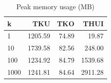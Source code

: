 \begin{table}[H]
\caption{Peak memory usage (MB)}\label{tab:memory}
\centering
\begin{tabular}{@{}lrrr@{}}
\toprule
\textbf{k} & \textbf{TKU} & \textbf{TKO} & \textbf{THUI} \\
\midrule
1 & 1205.59 & 74.89 & 19.87 \\
10 & 1739.58 & 82.56 & 248.00 \\
100 & 1234.92 & 84.79 & 1539.68 \\
1000 & 1241.81 & 84.64 & 2911.28 \\

\bottomrule
\end{tabular}
\end{table}